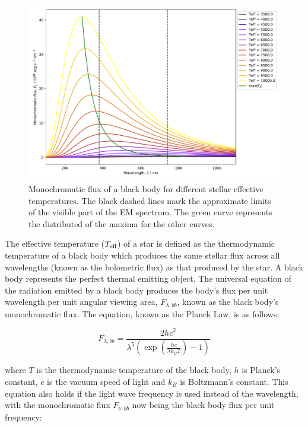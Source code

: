 \documentclass[12pt, a4paper]{report}
\begin{document}
\begin{figure}[h]
\begin{center}
\includegraphics[scale=0.5]{blackbody_teff_illustration.pdf}
\caption{Monochromatic flux of a black body for different stellar effective temperatures. The black dashed lines mark the approximate limits of the visible part of the EM spectrum. The green curve represents the distributed of the maxima for the other curves.}
\label{planck_curve}
\end{center}
\end{figure}

The effective temperature ($T_{\textnormal{eff}}$) of a star is defined as the thermodynamic temperature of a black body which produces the same stellar flux across all wavelengths (known as the bolometric flux) as that produced by the star. A black body represents the perfect thermal emitting object. The universal equation of the radiation emitted by a black body produces the body's flux per unit wavelength per unit angular viewing area, $F_{\lambda,bb}$, known as the black body's monochromatic flux. The equation, known as the Planck Law, is as follows:


\begin{equation}
F_{\lambda,bb} = \frac{2hc^{2}}{\lambda^{5}\left(\exp\left({\frac{hc}{\lambda k_{B}T}}\right) - 1\right)}
\label{planck_bb}
\end{equation} 

where $T$ is the thermodynamic temperature of the black body, $h$ is Planck's constant, $c$ is the vacuum speed of light and $k_{B}$ is Boltzmann's constant. This equation also holds if the light wave frequency is used instead of the wavelength, with the monochromatic flux $F_{\nu,bb}$ now being the black body flux per unit frequency:
\end{document}

